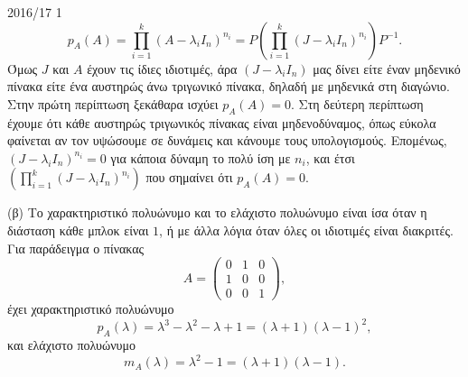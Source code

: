 \documentclass[a4paper,11pt]{article}
\begin{document}
\begin{solution}{2016/17 1}
\begin{equation*}
        p_A(A) = \prod_{i=1}^k(A - \lambda_iI_n)^{n_i} =
        P\left( \prod_{i=1}^k(J - \lambda_iI_n)^{n_i} \right) P^{-1}.
    \end{equation*}
    Όμως \( J \) και \( A \) έχουν τις ίδιες ιδιοτιμές, άρα \( (J - \lambda_i
    I_n) \) μας δίνει είτε έναν μηδενικό πίνακα είτε ένα αυστηρώς άνω τριγωνικό πίνακα,
    δηλαδή με μηδενικά στη διαγώνιο. Στην πρώτη περίπτωση ξεκάθαρα ισχύει
    \( p_A(A) = 0 \). Στη δεύτερη περίπτωση έχουμε ότι κάθε αυστηρώς τριγωνικός
    πίνακας είναι μηδενοδύναμος, όπως εύκολα φαίνεται αν τον υψώσουμε σε δυνάμεις
    και κάνουμε τους υπολογισμούς. Επομένως, \( (J - \lambda_iI_n)^{n_i} = 0 \)
    για κάποια δύναμη το πολύ ίση με \( n_i \), και έτσι
    \( \left( \prod_{i=1}^k(J - \lambda_iI_n)^{n_i} \right) \) που
    σημαίνει ότι \( p_A(A) = 0 \).

    (β) Το χαρακτηριστικό πολυώνυμο και το ελάχιστο πολυώνυμο είναι ίσα όταν η
    διάσταση κάθε  μπλοκ είναι \( 1 \), ή με άλλα λόγια όταν όλες οι
    ιδιοτιμές είναι διακριτές. Για παράδειγμα ο πίνακας
    \begin{equation*}
        A =
        \begin{pmatrix}
            0 & 1 & 0 \\
            1 & 0 & 0 \\
            0 & 0 & 1
        \end{pmatrix},
    \end{equation*}
    έχει χαρακτηριστικό πολυώνυμο
    \begin{equation*}
        p_A(\lambda) = \lambda^3 - \lambda^2 - \lambda + 1 = (\lambda +
        1)(\lambda - 1)^2,
    \end{equation*}
    και ελάχιστο πολυώνυμο
    \begin{equation*}
        m_A(\lambda) = \lambda^2 - 1 = (\lambda + 1)(\lambda - 1).
    \end{equation*}


\end{solution}
\end{document}
